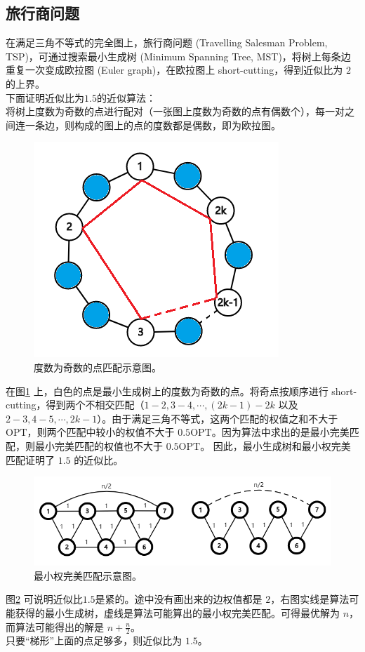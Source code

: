 \subsection{旅行商问题}
在满足三角不等式的完全图上，旅行商问题 (Travelling Salesman Problem, TSP)，可通过搜索最小生成树 (Minimum Spanning Tree, MST)，将树上每条边重复一次变成欧拉图 (Euler graph)，在欧拉图上 short-cutting，得到近似比为 $2$的上界。 \\
下面证明近似比为$1.5$的近似算法： \\
将树上度数为奇数的点进行配对（一张图上度数为奇数的点有偶数个），每一对之间连一条边，则构成的图上的点的度数都是偶数，即为欧拉图。 \\
\begin{figure}[H]
    \begin{center}
        \includegraphics[scale=0.8]{img/tsp.png}
        \caption{度数为奇数的点匹配示意图。}
        \label{img:tsp}
    \end{center}
\end{figure}
在图\ref{img:tsp} 上，白色的点是最小生成树上的度数为奇数的点。将奇点按顺序进行 short-cutting，得到两个不相交匹配（$1 - 2, 3 - 4, \cdots, (2k - 1) - 2k$ 以及 $2 - 3, 4 - 5, \cdots, 2k - 1$）。由于满足三角不等式，这两个匹配的权值之和不大于 $\text{OPT}$，则两个匹配中较小的权值不大于 $0.5\text{OPT}$。因为算法中求出的是最小完美匹配，则最小完美匹配的权值也不大于 $0.5\text{OPT}$。
因此，最小生成树和最小权完美匹配证明了 $1.5$ 的近似比。
\begin{figure}[H]
    \begin{center}
        \includegraphics[scale=0.8]{img/tsp_2.png}
        \caption{最小权完美匹配示意图。}
        \label{img:tsp_2}
    \end{center}
\end{figure}
图\ref{img:tsp_2} 可说明近似比$1.5$是紧的。途中没有画出来的边权值都是 $2$，右图实线是算法可能获得的最小生成树，虚线是算法可能算出的最小权完美匹配。可得最优解为 $n$，而算法可能得出的解是 $n + \frac{n}{2}$。 \\
只要“梯形”上面的点足够多，则近似比为 $1.5$。

